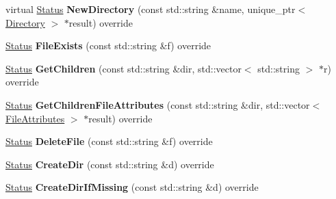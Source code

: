 \begin{DoxyCompactItemize}
\item 
virtual \hyperlink{classrocksdb_1_1Status}{Status} {\bfseries New\+Directory} (const std\+::string \&name, unique\+\_\+ptr$<$ \hyperlink{classrocksdb_1_1Directory}{Directory} $>$ $\ast$result) override\hypertarget{classrocksdb_1_1EnvWrapper_af6a51b6a782c76e343d0762137bf462d}{}\label{classrocksdb_1_1EnvWrapper_af6a51b6a782c76e343d0762137bf462d}

\item 
\hyperlink{classrocksdb_1_1Status}{Status} {\bfseries File\+Exists} (const std\+::string \&f) override\hypertarget{classrocksdb_1_1EnvWrapper_a26e009afcc388524815ce1652afefb6c}{}\label{classrocksdb_1_1EnvWrapper_a26e009afcc388524815ce1652afefb6c}

\item 
\hyperlink{classrocksdb_1_1Status}{Status} {\bfseries Get\+Children} (const std\+::string \&dir, std\+::vector$<$ std\+::string $>$ $\ast$r) override\hypertarget{classrocksdb_1_1EnvWrapper_a88542d17182f47d14d5f717204c8b831}{}\label{classrocksdb_1_1EnvWrapper_a88542d17182f47d14d5f717204c8b831}

\item 
\hyperlink{classrocksdb_1_1Status}{Status} {\bfseries Get\+Children\+File\+Attributes} (const std\+::string \&dir, std\+::vector$<$ \hyperlink{structrocksdb_1_1Env_1_1FileAttributes}{File\+Attributes} $>$ $\ast$result) override\hypertarget{classrocksdb_1_1EnvWrapper_a5bbff8711a5422883d5a1bc73bbe1032}{}\label{classrocksdb_1_1EnvWrapper_a5bbff8711a5422883d5a1bc73bbe1032}

\item 
\hyperlink{classrocksdb_1_1Status}{Status} {\bfseries Delete\+File} (const std\+::string \&f) override\hypertarget{classrocksdb_1_1EnvWrapper_ad53db88a845b6691ec87ad45d3d27c9f}{}\label{classrocksdb_1_1EnvWrapper_ad53db88a845b6691ec87ad45d3d27c9f}

\item 
\hyperlink{classrocksdb_1_1Status}{Status} {\bfseries Create\+Dir} (const std\+::string \&d) override\hypertarget{classrocksdb_1_1EnvWrapper_a131daf98774112cf7b52a693519ed04a}{}\label{classrocksdb_1_1EnvWrapper_a131daf98774112cf7b52a693519ed04a}

\item 
\hyperlink{classrocksdb_1_1Status}{Status} {\bfseries Create\+Dir\+If\+Missing} (const std\+::string \&d) override\hypertarget{classrocksdb_1_1EnvWrapper_a780722e8cd623b67cb573e861b24476c}{}\label{classrocksdb_1_1EnvWrapper_a780722e8cd623b67cb573e861b24476c}


\end{DoxyCompactItemize}
